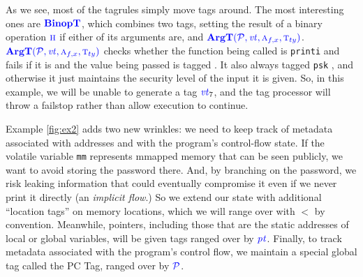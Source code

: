 \documentclass{llncs}
\begin{document}
As we see, most of the tagrules simply move tags around. The most interesting ones are \(\color{blue} \mathbf{BinopT}\),
which combines two tags, setting the result of a binary operation \(\textnormal{\color{blue} \sc h}\) if either of its arguments are,
and \(\color{blue} \mathbf{ArgT}(\mathcal{\color{blue} P}, \mathit{\color{blue} vt}, {\color{blue} \textnormal{\sc a}_{f,x}}, {\color{blue} \textnormal{\sc t}_{ty}})\). \(\color{blue} \mathbf{ArgT}(\mathcal{\color{blue} P}, \mathit{\color{blue} vt}, {\color{blue} \textnormal{\sc a}_{f,x}}, {\color{blue} \textnormal{\sc t}_{ty}})\) checks whether the function being called is {\tt printi} and fails if it is
and the value being passed is tagged \high. It also always tagged {\tt psk} \high, and otherwise it just maintains
the security level of the input it is given. So, in this example, we will be unable to generate a tag
\(\mathit{\color{blue} vt}_7\), and the tag processor will throw a failstop rather than allow execution to continue.

Example \ref{fig:ex2} adds two new wrinkles: we need to keep track of metadata associated with
addresses and with the program's control-flow state. If the volatile variable {\tt mm} represents
mmapped memory that can be seen publicly, we want to avoid storing the password there. And, by
branching on the password, we risk leaking information that could eventually compromise it even
if we never print it directly (an {\em implicit flow}.) So we extend our state with additional
``location tags'' on memory locations, which we will range over with \(\lt\) by convention.
Meanwhile, pointers, including those that are the static addresses of local or global variables,
will be given tags ranged over by \(\mathit{\color{blue} pt}\). Finally, to track metadata associated with the program's
control flow, we maintain a special global tag called the PC Tag, ranged over by \(\mathcal{\color{blue} P}\).
\end{document}
